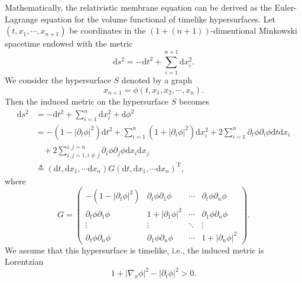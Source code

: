 \documentclass[10pt,leqno]{amsart}
\numberwithin{equation}{section}
\begin{document}
Mathematically, the relativistic membrane equation can be derived as the Euler-Lagrange equation for the volume functional of timelike hypersurfaces.
Let $(t,x_{1},\cdots,x_{n+1})$ be coordinates in the $(1+(n+1))$-dimentional Minkowski spacetime endowed with the metric
\begin{equation}
	\mathrm{d}s^2 = - \mathrm{d} t^2 + \sum\limits_{i=1}^{n+1} \mathrm{d}x_{i}^2.
\end{equation}
We consider the hypersurface $S$ denoted by a graph
\begin{equation} \label{graph}
	x_{n+1}=\phi(t,x_{1},x_{2}, \cdots, x_{n}).
\end{equation} 
Then the induced metric on the hypersurface $S$ becomes
\begin{equation} \label{induced metric}
	\begin{aligned}
		\mathrm{d}s^2 &= - \mathrm{d}t^2 + \sum\limits_{i=1}^{n} \mathrm{d}x_{i}^2 + \mathrm{d}\phi^2 \\
		& = -( 1-|\partial_{t} \phi|^2 ) \mathrm{d}t^2 + \sum\limits_{i=1}^{n} (1+|\partial_{i} \phi|^{2})\mathrm{d}x_{i}^2 + 2  \sum\limits_{i=1}^{n} \partial_{t} \phi \partial_{i} \phi \mathrm{d}t \mathrm{d}x_{i} \\
		& \ \ \ \ + 2 \sum\limits_{i,j=1,i \neq j}^{i,j=n} \partial_{i} \phi\partial_{j} \phi \mathrm{d}x_{i}\mathrm{d}x_{j} \\
		& \triangleq ( \mathrm{d}t, \mathrm{d}x_{1}, \cdots \mathrm{d}x_{n} ) G ( \mathrm{d}t, \mathrm{d}x_{1}, \cdots \mathrm{d}x_{n} )^\mathrm{T} ,
	\end{aligned}
\end{equation}
where 
\begin{equation*} 
	G = \left( 
	\begin{array}{cccc}
		-( 1-|\partial_{t} \phi|^2 ) & \partial_{t} \phi \partial_{1} \phi  & \cdots & \partial_{t} \phi \partial_{n} \phi \\
		\partial_{t} \phi \partial_{1} \phi& 1+ |\partial_{1} \phi|^2  & \cdots & \partial_{1} \phi\partial_{n} \phi \\
		\vdots & \vdots  & \ddots & \vdots\\
		\partial_{t} \phi \partial_{n} \phi& \partial_{1} \phi \partial_{n} \phi  & \cdots & 1+ |\partial_{n} \phi|^2
	\end{array}
	\right).
\end{equation*}
We assume that this hypersurface is timelike, i.e., the induced metric is Lorentzian
\begin{equation} \label{time like condition}
	1+|\nabla_{x}\phi|^{2}-|\partial_{t} \phi|^{2} >0.
\end{equation}
\end{document}

